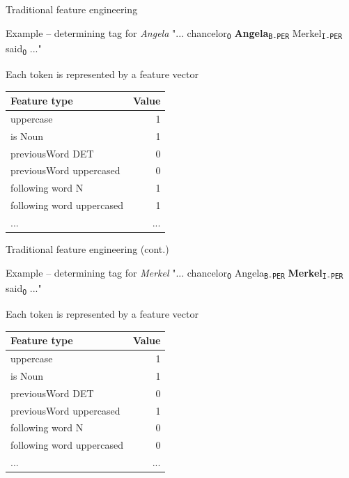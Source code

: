\documentclass[12pt]{beamer}
\newcommand*\POS[1]{\textsubscript{\texttt{#1}}} %
\begin{document}
\begin{frame}{Traditional feature engineering}
	
	\begin{exampleblock}{Example -- determining tag for \emph{Angela}}
		"... chancelor\POS{O} \textbf{Angela}\POS{B-PER} Merkel\POS{I-PER} said\POS{O} ..."
	\end{exampleblock}
	
Each token is represented by a feature vector

\begin{table}
	\small
	\begin{tabular}{@{} lr @{}}
		\toprule
		Feature type & Value \\
		\midrule
		uppercase & 1\\
		is Noun & 1\\
		previousWord DET& 0\\
		previousWord uppercased& 0\\
		following word N & 1\\
		following word uppercased & 1 \\
		... & ... \\
		\bottomrule
	\end{tabular}
\end{table}

\end{frame}

\begin{frame}{Traditional feature engineering (cont.)}
	
	\begin{exampleblock}{Example -- determining tag for \emph{Merkel}}
		"... chancelor\POS{O} Angela\POS{B-PER} \textbf{Merkel}\POS{I-PER} said\POS{O} ..."
	\end{exampleblock}
	
	Each token is represented by a feature vector
	
	\begin{table}
		\small
		\begin{tabular}{@{} lr @{}}
			\toprule
			Feature type & Value \\
			\midrule
			uppercase & 1\\
			is Noun & 1\\
			previousWord DET& 0\\
			previousWord uppercased& 1\\
			following word N & 0\\
			following word uppercased & 0 \\
			... & ... \\
			\bottomrule
		\end{tabular}
	\end{table}
	
\end{frame}
\end{document}
